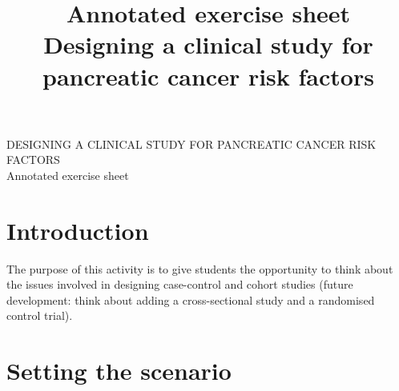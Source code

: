 \documentclass[a4paper,11pt]{scrartcl}
\title{Annotated exercise sheet \\ Designing a clinical study for pancreatic cancer risk factors}
\date{}
\newcommand{\ignore}[1]{}
\theoremstyle{plain}
\theoremstyle{remark}
\theoremstyle{definition}
\begin{document}
\begin{center}
{\LARGE DESIGNING A CLINICAL STUDY FOR PANCREATIC CANCER RISK FACTORS \\ \medskip Annotated exercise sheet}
\end{center}



\section{Introduction}
\label{sec:introduction}

The purpose of this activity is to give students the opportunity to think about the issues involved in designing case-control and cohort studies (future development: think about adding a cross-sectional study and a randomised control trial). \ignore{ The activity is designed to be used both for face-to-face teaching and for distant learners, with the due adaptations. A sheet will be handed out with the scenario and the scheme here included, and another, pre-filled with answers will be made available at the end of the activity. }

   

\ignore{
\section{Presentation (5 minutes)}
\textit{\textbf{Don't hand out sheets yet. }}

\medskip

With the use of a presentation, recap case-control and cohort studies designs, what is a biobank. Then move to the questions here below. 
}

\section{Setting the scenario}
\end{document}
